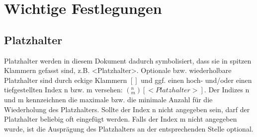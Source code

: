 \section{Wichtige Festlegungen}
\subsection{Platzhalter}
Platzhalter werden in diesem Dokument dadurch symbolisiert, dass sie in spitzen Klammern gefasst sind, z.B. <Platzhalter>. Optionale bzw. wiederholbare Platzhalter sind durch eckige Klammern $[ ]$ und ggf. einen hoch- und/oder einen tiefgestellten Index n bzw. m versehen:  $(_m^n) [<Platzhalter>]$. Der Indizes n und m kennzeichnen die maximale bzw. die minimale Anzahl für die Wiederholung des Platzhalters. Sollte der Index n nicht angegeben sein, darf der Platzhalter beliebig oft eingefügt werden. Falls der Index m nicht angegeben wurde, ist die Ausprägung des Platzhalters an der entsprechenden Stelle optional. 
